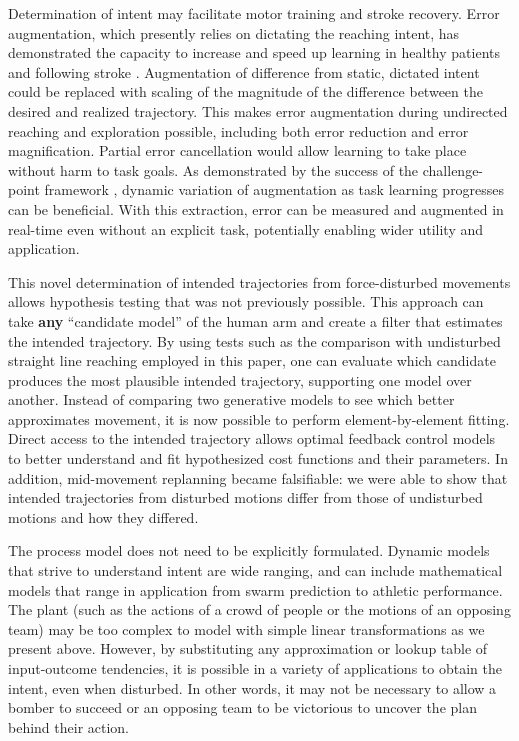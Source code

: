 Determination of intent may facilitate motor training and stroke recovery. Error augmentation, which presently relies on dictating the reaching intent, has demonstrated the capacity to increase and speed up learning in healthy patients \cite{patton2004robot} and following stroke \cite{patton2006evaluation}. Augmentation of difference from static, dictated intent could be replaced with scaling of the magnitude of the difference between the desired and realized trajectory. This makes error augmentation during undirected reaching and exploration possible, including both error reduction and error magnification. Partial error cancellation would allow learning to take place without harm to task goals. As demonstrated by the success of the challenge-point framework \cite{guadagnoli2004challenge}, dynamic variation of augmentation as task learning progresses can be beneficial. With this extraction, error can be measured and augmented in real-time even without an explicit task, potentially enabling wider utility and application. 

This novel determination of intended trajectories from force-disturbed movements allows hypothesis testing that was not previously possible. This approach can take \textbf{any} ``candidate model'' of the human arm and create a filter that estimates the intended trajectory. By using tests such as the comparison with undisturbed straight line reaching employed in this paper, one can evaluate which candidate produces the most plausible intended trajectory, supporting one model over another.  Instead of comparing two generative models to see which better approximates movement, it is now possible to perform element-by-element fitting. Direct access to the intended trajectory allows optimal feedback control models to better understand and fit hypothesized cost functions and their parameters. In addition, mid-movement replanning became falsifiable: we were able to show that intended trajectories from disturbed motions differ from those of undisturbed motions and how they differed.

The process model does not need to be explicitly formulated. Dynamic models that strive to understand intent are wide ranging, and can include mathematical models that range in application from swarm prediction to athletic performance. The plant (such as the actions of a crowd of people or the motions of an opposing team) may be too complex to model with simple linear transformations as we present above. However, by substituting any approximation or lookup table of input-outcome tendencies, it is possible in a variety of applications to obtain the intent, even when disturbed. In other words, it may not be necessary to allow a bomber to succeed or an opposing team to be victorious to uncover the plan behind their action.

